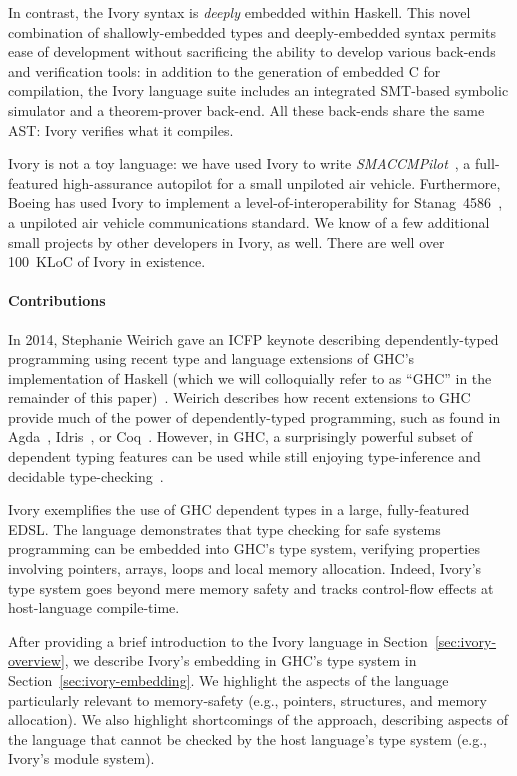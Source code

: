In contrast, the Ivory syntax is \emph{deeply} embedded within
Haskell.  This novel combination of shallowly-embedded types and
deeply-embedded syntax permits ease of development without sacrificing
the ability to develop various back-ends and verification tools: in
addition to the generation of embedded C for compilation, the Ivory
language suite includes an integrated SMT-based symbolic simulator and
a theorem-prover back-end.  All these back-ends share the same AST:
Ivory verifies what it compiles.


Ivory is not a toy language: we have used Ivory to write
\emph{SMACCMPilot}~\cite{smaccm}, a full-featured high-assurance
autopilot for a small unpiloted air vehicle.  Furthermore, Boeing has
used Ivory to implement a level-of-interoperability for
Stanag~4586~\cite{stanag}, a unpiloted air vehicle communications
standard. We know of a few additional small projects by other
developers in Ivory, as well.  There are well over 100~KLoC of Ivory in existence.



\paragraph{Contributions}
In 2014, Stephanie Weirich gave an ICFP keynote describing dependently-typed programming
using recent type and language extensions of GHC's implementation of Haskell
(which we will colloquially refer to as ``GHC'' in the remainder of this
paper)~\cite{weirich-keynote}. Weirich describes how recent extensions to GHC
provide much of the power of dependently-typed programming, such as found in
Agda~\cite{agda}, Idris~\cite{idris}, or Coq~\cite{coq}. However, in GHC, a
surprisingly powerful subset of dependent typing features can be used while
still enjoying type-inference and decidable type-checking~\cite{dephaskell}.

Ivory exemplifies the use of GHC dependent types in a large, fully-featured
EDSL. The language demonstrates that type checking for safe systems programming
can be embedded into GHC's type system, verifying properties involving
pointers, arrays, loops and local memory allocation. Indeed, Ivory's type
system goes beyond mere memory safety and tracks control-flow effects at host-language
compile-time.

After providing a brief introduction to the Ivory language in
Section~\ref{sec:ivory-overview}, we describe Ivory's embedding in GHC's type
system in Section~\ref{sec:ivory-embedding}. We highlight the aspects of the
language particularly relevant to memory-safety (e.g., pointers, structures, and
memory allocation). We also highlight shortcomings of the approach, describing
aspects of the language that cannot be checked by the host language's type
system (e.g., Ivory's module system).

